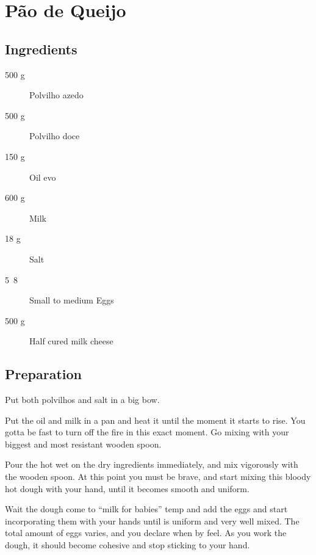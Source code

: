 \setchapterpreamble[u]{\margintoc}
\chapter{Pão de Queijo}

\section{Ingredients}

\begin{multicols}{2}
\begin{description}
	\item[500 g] Polvilho azedo
	\item[500 g] Polvilho doce
	\item[150 g] Oil \gls{evo}
	\item[600 g] Milk
	\item[18 g] Salt
	\item[5~8 ] Small to medium Eggs
	\item[500 g] Half cured milk cheese
\end{description}
\end{multicols}

\section{Preparation}
Put both polvilhos and salt in a big bow.

Put the oil and milk in a pan and heat it until the moment it starts to rise. You gotta be fast to turn off the fire in this exact moment. 
%
Go mixing with your biggest and most resistant wooden spoon.

Pour the hot wet on the dry ingredients immediately, and mix vigorously with the wooden spoon.
%
At this point you must be brave, and start mixing this bloody hot dough with your hand, until it becomes smooth and uniform.

Wait the dough come to ``milk for babies'' temp and add the eggs and start incorporating them with your hands until is uniform and very well mixed.
%
The total amount of eggs varies, and you declare when by feel.
%
As you work the dough, it should become cohesive and stop sticking to your hand.

